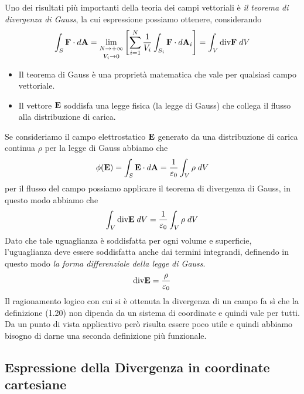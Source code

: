 \noindent Uno dei risultati pi\`u importanti della teoria dei campi vettoriali \`e \textit{il teorema di divergenza di Gauss}, la cui espressione possiamo ottenere, considerando
\begin{equation}
	\int_{S}\bold{F} \cdot d\bold{A} = \lim\limits_{\substack{N \to +\infty \\[0.1cm] V_i \to 0}}\left [ \sum_{i=1}^N \frac{1}{V_i} \int_{S_i} \bold{F} \cdot d\bold{A}_i \right ] = \int_{V}\text{div}\bold{F} \; dV
\end{equation}

\begin{remark}
\end{remark}
\begin{itemize}
	\item Il teorema di Gauss \`e una propriet\`a matematica che vale per qualsiasi campo vettoriale.
	\item Il vettore $\bold{E}$ soddisfa una legge fisica (la legge di Gauss) che collega il flusso alla distribuzione di carica.
\end{itemize}	

\noindent Se consideriamo il campo elettrostatico $\bold{E}$ generato da una distribuzione di carica continua $\rho$ per la legge di Gauss abbiamo che
\begin{equation*}
	\phi(\bold{E})=\int_{S}\bold{E} \cdot d\bold{A} = \frac{1}{\varepsilon_0} \int_{V} \rho \; dV
\end{equation*}
per il flusso del campo possiamo applicare il teorema di divergenza di Gauss, in questo modo abbiamo che 
\begin{equation*}
	\int_{V} \text{div}\bold{E} \; dV = \frac{1}{\varepsilon_0} \int_{V} \rho \; dV
\end{equation*}
Dato che tale uguaglianza \`e soddisfatta per ogni volume e superficie, l'uguaglianza deve essere soddisfatta anche dai termini integrandi, definendo in questo modo \textit{la forma differenziale della legge di Gauss}.
\begin{equation}
	\text{div}\bold{E} = \frac{\rho}{\varepsilon_0} 
\end{equation}
Il ragionamento logico con cui si \`e ottenuta la divergenza di un campo fa s\`i che la definizione (1.20) non dipenda da un sistema di coordinate e quindi vale per tutti. Da un punto di vista applicativo per\`o risulta essere poco utile e quindi abbiamo bisogno di darne una seconda definizione pi\`u funzionale.

\subsection{Espressione della Divergenza in coordinate cartesiane}

